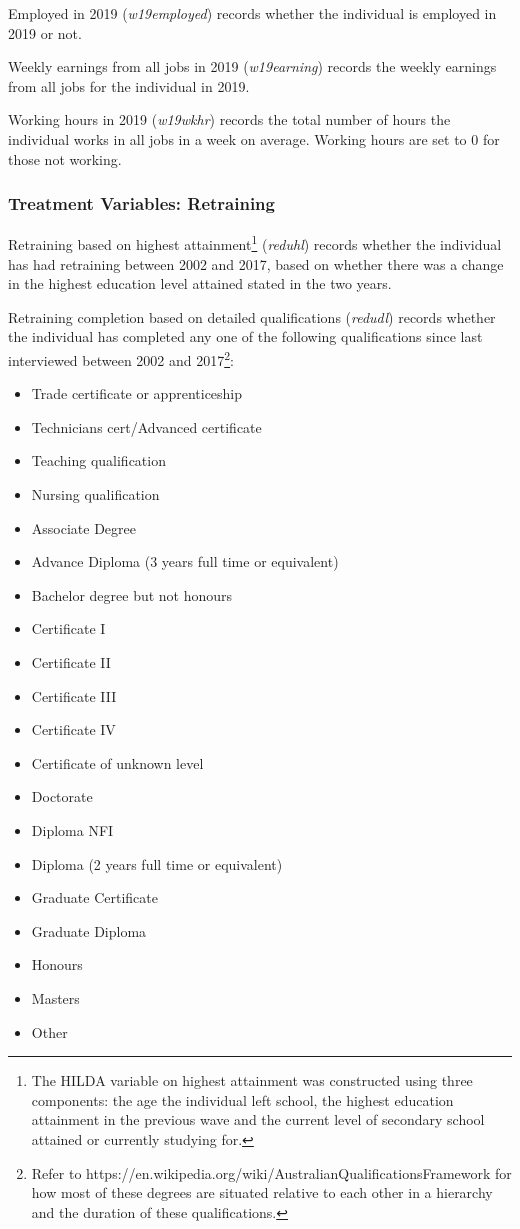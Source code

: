 \documentclass[12pt, a4paper]{article}
\begin{document}
Employed in 2019 (\textit{w19\textunderscore{}employed}) records whether the individual is employed in 2019 or not. 

Weekly earnings from all jobs in 2019 (\textit{w19\textunderscore{}earning}) records the weekly earnings from all jobs for the individual in 2019. 

Working hours in 2019 (\textit{w19\textunderscore{}wkhr}) records the total number of hours the individual works in all jobs in a week on average. Working hours are set to 0 for those not working. 

\subsubsection{Treatment Variables: Retraining}
Retraining based on highest attainment\footnote{The HILDA variable on highest attainment was constructed using three components: the age the individual left school, the highest education attainment in the previous wave and the current level of secondary school attained or currently studying for.} (\textit{reduhl}) records whether the individual has had retraining between 2002 and 2017, based on whether there was a change in the highest education level attained stated in the two years.  

Retraining completion based on detailed qualifications (\textit{redudl}) records whether the individual has completed any one of the following qualifications since last interviewed between 2002 and 2017\footnote{Refer to https://en.wikipedia.org/wiki/Australian\textunderscore{}Qualifications\textunderscore{}Framework for how most of these degrees are situated relative to each other in a hierarchy and the duration of these qualifications.}:

\begin{itemize}
  \item Trade certificate or apprenticeship
  \item Technicians cert/Advanced certificate
  \item Teaching qualification 
  \item Nursing qualification 
  \item Associate Degree
  \item Advance Diploma (3 years full time or equivalent)
  \item Bachelor degree but not honours
  \item Certificate I
  \item Certificate II
  \item Certificate III
  \item Certificate IV
  \item Certificate of unknown level
  \item Doctorate
  \item Diploma NFI
  \item Diploma (2 years full time or equivalent)
  \item Graduate Certificate
  \item Graduate Diploma 
  \item Honours 
  \item Masters 
  \item Other 
\end{itemize}  
\end{document}
